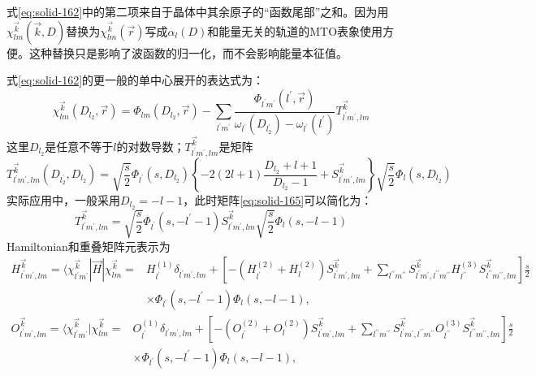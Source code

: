 式\eqref{eq:solid-162}中的第二项来自于晶体中其余原子的“函数尾部”之和。因为用$\chi_{lm}^{\vec k}(\vec k,D)$替换为$\chi_{lm}^{\vec k}(\vec r)$写成$\alpha_l(D)$和能量无关的轨道的MTO表象使用方便。这种替换只是影响了波函数的归一化，而不会影响能量本征值。

式\eqref{eq:solid-162}的更一般的单中心展开的表达式为：
\begin{equation}
  \chi_{lm}^{\vec k}(D_{l_2},\vec r)=\Phi_{lm}(D_{l_2},\vec r)-\sum_{l^{\prime}m^{\prime}}\frac{\Phi_{l^{\prime}m^{\prime}}(l^{\prime},\vec r)}{\omega_{l^{\prime}}(D_{l_2^{\prime}})-\omega_{l^{\prime}}(l^{\prime})}T_{l^{\prime}m^{\prime},lm}^{\vec k}
  \label{eq:solid-164}
\end{equation}
这里$D_{l_2}$是任意不等于$l$的对数导数；$T_{l^{\prime}m^{\prime},lm}^{\vec k}$是矩阵
\begin{equation}
  T_{l^{\prime}m^{\prime},lm}^{\vec k}(D_{l_2^{\prime}},D_{l_2})=\sqrt{\frac s2}\Phi_{l^{\prime}}(s,D_{l_2})\left\{-2(2l+1)\frac{D_{l_2}+l+1}{D_{l_2}-1}+S_{l^{\prime}m^{\prime},lm}^{\vec k}\right\}\sqrt{\frac s2}\Phi_l(s,D_{l_2})
  \label{eq:solid-165}
\end{equation}
实际应用中，一般采用$D_{l_2}=-l-1$，此时矩阵\eqref{eq:solid-165}可以简化为：
\begin{equation}
  T_{l^{\prime}m^{\prime},lm}^{\vec k}=\sqrt{\frac s2}\Phi_{l^{\prime}}(s,-l^{\prime}-1)S_{l^{\prime}m^{\prime},lm}^{\vec k}\sqrt{\frac s2}\Phi_l(s,-l-1)
  \label{eq:solid-166}
\end{equation}
Hamiltonian和重叠矩阵元表示为
\begin{equation}
  \begin{split}
    H_{l^{\prime}m^{\prime},lm}^{\vec k}=\langle\chi_{l^{\prime}m^{\prime}}^{\vec k}|\vec H|\chi_{lm}^{\vec k}=&H_{l^{\prime}}^{(1)}\delta_{l^{\prime}m^{\prime},lm}+\left[-(H_{l^{\prime}}^{(2)}+H_l^{(2)})S_{l^{\prime}m^{\prime},lm}^{\vec k}+\sum_{l^{\prime\prime}m^{\prime\prime}}S_{l^{\prime}m^{\prime},l^{\prime\prime}m^{\prime\prime}}^{\vec k}H_{l^{\prime\prime}}^{(3)}S_{l^{\prime\prime}m^{\prime\prime},lm}^{\vec k}\right]\frac s2\\
    &\times\Phi_{l^{\prime}}(s,-l^{\prime}-1)\Phi_l(s,-l-1),
  \end{split}
  \label{eq:solid-167}
\end{equation}
\begin{equation}
  \begin{split}
    O_{l^{\prime}m^{\prime},lm}^{\vec k}=\langle\chi_{l^{\prime}m^{\prime}}^{\vec k}|\chi_{lm}^{\vec k}=&O_{l^{\prime}}^{(1)}\delta_{l^{\prime}m^{\prime},lm}+\left[-(O_{l^{\prime}}^{(2)}+O_l^{(2)})S_{l^{\prime}m^{\prime},lm}^{\vec k}+\sum_{l^{\prime\prime}m^{\prime\prime}}S_{l^{\prime}m^{\prime},l^{\prime\prime}m^{\prime\prime}}^{\vec k}O_{l^{\prime\prime}}^{(3)}S_{l^{\prime\prime}m^{\prime\prime},lm}^{\vec k}\right]\frac s2\\
    &\times\Phi_{l^{\prime}}(s,-l^{\prime}-1)\Phi_l(s,-l-1),
  \end{split}
  \label{eq:solid-168}
\end{equation}
